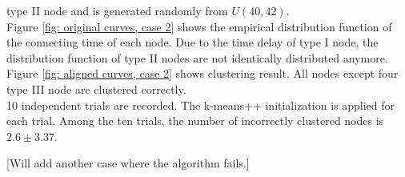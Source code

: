 type II node and is generated randomly from $U(40,42)$.
\\
Figure \ref{fig: original curves, case 2} shows the empirical distribution function of the connecting time of each node. Due to the time delay of type I node, the distribution function of type II nodes are not identically distributed anymore.
Figure \ref{fig: aligned curves, case 2} shows clustering result. All nodes except four type III node are clustered correctly.
\\
10 independent trials are recorded. 
The k-means++ initialization is applied for each trial.
Among the ten trials, the number of incorrectly clustered nodes is $2.6\pm 3.37$.

 

[Will add another case where the algorithm fails.]




